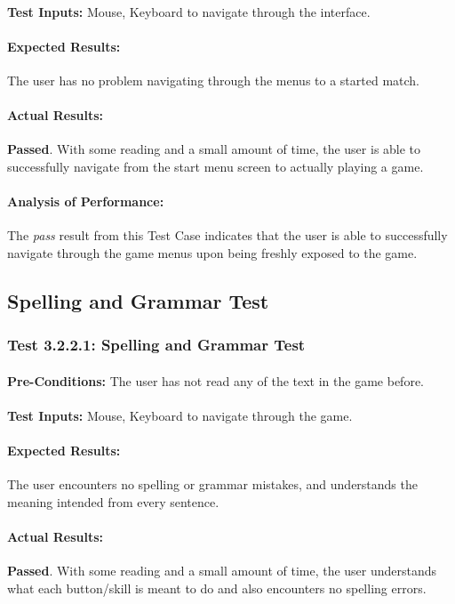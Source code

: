 \documentclass{article}
\begin{document}
    \paragraph{}\textbf{Test Inputs:} Mouse, Keyboard to navigate through the interface.
    \paragraph{Expected Results:} The user has no problem navigating through the menus to a started match.
    \paragraph{Actual Results:} \textbf{Passed}. With some reading and a small amount of time, the user is able to successfully navigate from the start menu screen to actually playing a game.
    \paragraph{Analysis of Performance:} The \emph{pass} result from this Test Case indicates that the user is able to successfully navigate through the game menus upon being freshly exposed to the game.
\subsection{Spelling and Grammar Test}
\subsubsection{Test 3.2.2.1: Spelling and Grammar Test }
    \paragraph{}\textbf{Pre-Conditions:} The user has not read any of the text in the game before.
    \paragraph{}\textbf{Test Inputs:} Mouse, Keyboard to navigate through the game.
    \paragraph{Expected Results:} The user encounters no spelling or grammar mistakes, and understands the meaning intended from every sentence.
    \paragraph{Actual Results:} \textbf{Passed}. With some reading and a small amount of time, the user understands what each button/skill is meant to do and also encounters no spelling errors.
\end{document}
